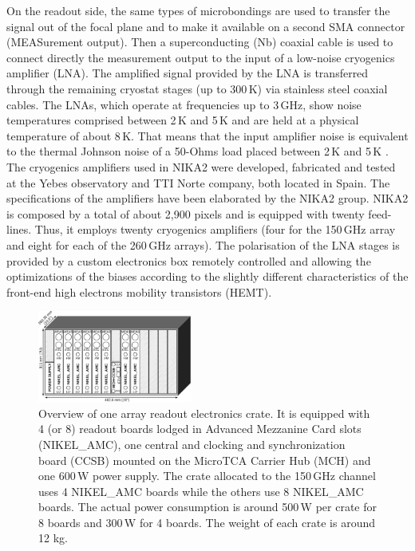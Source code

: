 \documentclass[]{aa} %
\begin{document}
On the readout side, the same types of microbondings are used to transfer the signal out of the focal plane and to make it available on a second SMA connector (MEASurement output). Then a superconducting (Nb) coaxial cable is used to connect directly the measurement output to the input of a low-noise cryogenics amplifier (LNA). The amplified signal provided by the LNA is transferred through the remaining cryostat stages (up to 300\,K) via stainless steel coaxial cables. The LNAs, which operate at frequencies up to 3\,GHz, show noise temperatures comprised between 2\,K and 5\,K and are held at a physical temperature of about 8\,K. That means that the input amplifier noise is equivalent to the thermal Johnson noise of a 50-Ohms load placed between 2\,K and 5\,K . The cryogenics amplifiers used in NIKA2 were developed, fabricated and tested at the Yebes observatory and TTI Norte company, both located in Spain. The specifications of the amplifiers have been elaborated by the NIKA2 group. NIKA2 is composed by a total of about 2,900 pixels and is equipped with twenty feed-lines. Thus, it employs twenty cryogenics amplifiers (four for the 150\,GHz array and eight for each of the 260\,GHz arrays). The polarisation of the LNA stages is provided by a custom electronics box remotely controlled and allowing the optimizations of the biases according to the slightly different characteristics of the front-end high electrons mobility transistors (HEMT). 

\begin{figure}
\begin{center}
\includegraphics[angle=0,width=0.45\textwidth]{NIKA_crate}
\caption{Overview of one array readout electronics crate.
It is equipped with 4 (or 8) readout boards lodged in Advanced Mezzanine Card slots (NIKEL\_AMC), one central and clocking and synchronization board (CCSB) mounted on the MicroTCA Carrier Hub (MCH) and one 600\,W power supply.
The crate allocated to the 150\,GHz channel uses 4 NIKEL\_AMC boards while the others use 8 NIKEL\_AMC boards. The actual power consumption is around 500\,W per crate for 8 boards and 300\,W for 4 boards. The weight of each crate is around 12 kg.
\label{crateFig}}
\end{center}
\end{figure}
\end{document}
